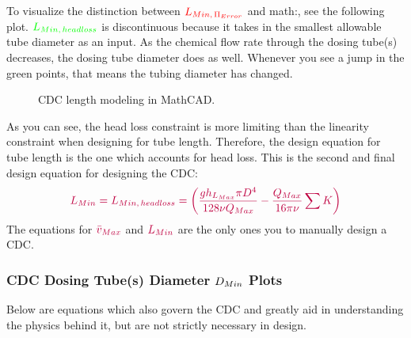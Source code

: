 \documentclass[letterpaper,10pt,english]{sphinxmanual}
\let\sphinxpxdimen\pdfpxdimen\else\newdimen\sphinxpxdimen
\begin{document}
To visualize the distinction between \(\color{red}{  L_{Min, \, \Pi_{Error}}}\) and math:, see the following plot. \(\color{green}{ L_{Min, \, head loss}}\) is discontinuous because it takes in the smallest allowable tube diameter as an input. As the chemical flow rate through the dosing tube(s) decreases, the dosing tube diameter does as well. Whenever you see a jump in the green points, that means the tubing diameter has changed.

\begin{figure}[htbp]
\centering
\capstart

\noindent\sphinxincludegraphics[width=600\sphinxpxdimen]{{CDC_length_model}.png}
\caption{CDC length modeling in MathCAD.}\label{\detokenize{Flow_Control_and_Measurement/FCM_Derivations:id7}}\label{\detokenize{Flow_Control_and_Measurement/FCM_Derivations:figure-cdc-length-model}}\end{figure}

As you can see, the head loss constraint is more limiting than the linearity constraint when designing for tube length. Therefore, the design equation for tube length is the one which accounts for head loss. This is the second and final design equation for designing the CDC:
\begin{equation}\label{equation:Flow_Control_and_Measurement/FCM_Derivations:Flow_Control_and_Measurement/FCM_Derivations:37}
\begin{split}\color{purple}{
L_{Min} = L_{Min, \, head loss} = \left( \frac{g h_{L_{Max}} \pi D^4}{128 \nu Q_{Max}} - \frac{Q_{Max}}{16 \pi \nu} \sum{K} \right)
}\end{split}
\end{equation}
The equations for \(\color{purple}{\bar v_{Max}}\) and \(\color{purple}{L_{Min}}\) are the only ones you  to manually design a CDC.


\subsubsection{CDC Dosing Tube(s) Diameter \protect\(D_{Min}\protect\) Plots}
\label{\detokenize{Flow_Control_and_Measurement/FCM_Derivations:cdc-dosing-tube-s-diameter-plots}}
Below are equations which also govern the CDC and greatly aid in understanding the physics behind it, but are not strictly necessary in design.
\end{document}
